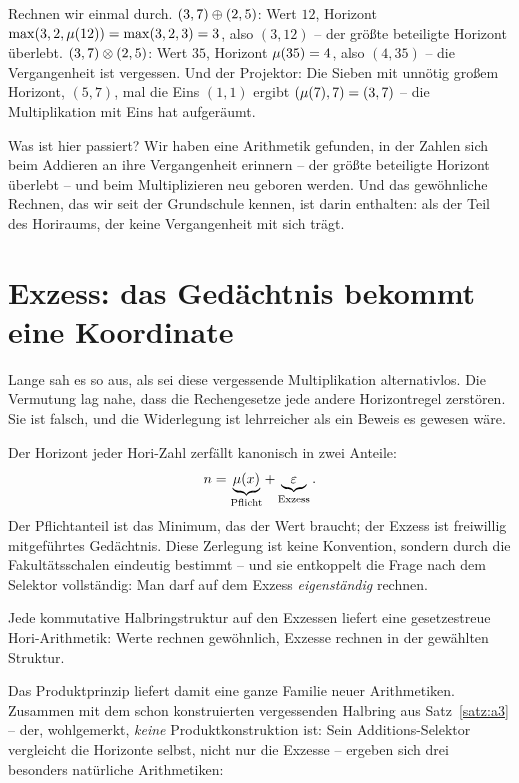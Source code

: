 \begin{beispiel}
Rechnen wir einmal durch. $(3,7)\oplus(2,5)$: Wert $12$, Horizont
$\max(3,2,\mu(12))=\max(3,2,3)=3$, also $(3,12)$ -- der größte
beteiligte Horizont überlebt. $(3,7)\otimes(2,5)$: Wert $35$,
Horizont $\mu(35)=4$, also $(4,35)$ -- die Vergangenheit ist
vergessen. Und der Projektor: Die Sieben mit unnötig großem
Horizont, $(5,7)$, mal die Eins $(1,1)$ ergibt
$(\mu(7),7)=(3,7)$ -- die Multiplikation mit Eins hat aufgeräumt.
\end{beispiel}

\begin{oberflaeche}
Was ist hier passiert? Wir haben eine Arithmetik gefunden, in der
Zahlen sich beim Addieren an ihre Vergangenheit erinnern -- der
größte beteiligte Horizont überlebt -- und beim Multiplizieren neu
geboren werden. Und das gewöhnliche Rechnen, das wir seit der
Grundschule kennen, ist darin enthalten: als der Teil des Horiraums,
der keine Vergangenheit mit sich trägt.
\end{oberflaeche}

\section{Exzess: das Gedächtnis bekommt eine Koordinate}

Lange sah es so aus, als sei diese vergessende Multiplikation
alternativlos. Die Vermutung lag nahe, dass die Rechengesetze jede
andere Horizontregel zerstören. Sie ist falsch, und die Widerlegung
ist lehrreicher als ein Beweis es gewesen wäre.

Der Horizont jeder Hori-Zahl zerfällt kanonisch in zwei Anteile:
\[
n=\underbrace{\mu(x)}_{\text{Pflicht}}
 +\underbrace{\varepsilon}_{\text{Exzess}} .
\]
Der Pflichtanteil ist das Minimum, das der Wert braucht; der Exzess
ist freiwillig mitgeführtes Gedächtnis. Diese Zerlegung ist keine
Konvention, sondern durch die Fakultätsschalen eindeutig bestimmt --
und sie entkoppelt die Frage nach dem Selektor vollständig: Man darf
auf dem Exzess \emph{eigenständig} rechnen.

\begin{satz}[Produktprinzip]\label{satz:produktprinzip}
Jede kommutative Halbringstruktur auf den Exzessen liefert eine
gesetzestreue Hori-Arithmetik: Werte rechnen gewöhnlich,
Exzesse rechnen in der gewählten Struktur.
\end{satz}

Das Produktprinzip liefert damit eine ganze Familie neuer
Arithmetiken. Zusammen mit dem schon konstruierten vergessenden
Halbring aus Satz~\ref{satz:a3} -- der, wohlgemerkt, \emph{keine}
Produktkonstruktion ist: Sein Additions-Selektor vergleicht die
Horizonte selbst, nicht nur die Exzesse -- ergeben sich drei
besonders natürliche Arithmetiken:


